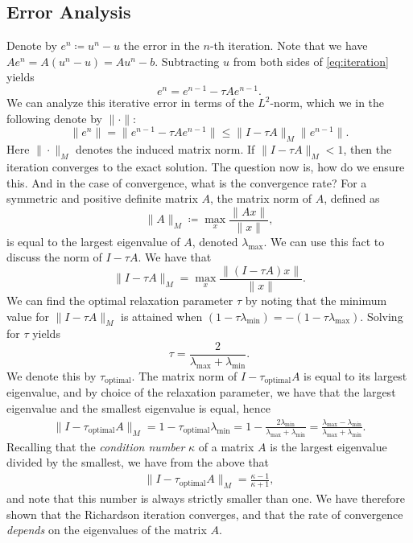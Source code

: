 \subsection{Error Analysis}
\label{sub:error_analysis}

Denote by \( e^n \coloneqq u^n - u \) the error in the \(n\)-th iteration.
Note that we have \( A e^n = A(u^n - u) = Au^n - b \). Subtracting \( u \)
from both sides of \cref{eq:iteration} yields
\begin{equation}
    \label{eq:iteration_error}
    e^n = e^{n-1} - \tau Ae^{n-1}.
\end{equation}
We can analyze this iterative error in terms of the \( L^2 \)-norm, which we in
the following denote by \( \| \cdot \| \):
\begin{equation}
    \| e^n \| = \| e^{n-1} - \tau Ae^{n-1} \| \leq \| I - \tau A\|_M \| e^{n-1}\|.
\end{equation}
Here \( \| \cdot \|_M\) denotes the induced matrix norm. If \( \| I - \tau A
\|_M < 1 \), then the iteration converges to the exact solution. The question
now is, how do we ensure this. And in the case of convergence, what is the
convergence rate?  For a symmetric and positive definite matrix \( A \), the
matrix norm of \( A \), defined as
\begin{equation}
    \| A \|_M \coloneqq \max_x \frac{\|Ax\|}{\|x\|},
\end{equation}
is equal to the largest eigenvalue of \( A \), denoted \( \lambda_{\max} \). We
can use this fact to discuss the norm of \( I - \tau A \). We have that
\begin{equation}
    \| I - \tau A \|_M = \max_x \frac{\|(I - \tau A)x\|}{\| x \|}.
\end{equation}
We can find the optimal relaxation parameter \( \tau \) by noting that the
minimum value for \( \| I - \tau A \|_M \) is attained when \( (1 - \tau
\lambda_{\min}) = - (1 - \tau \lambda_{\max}) \). Solving for \( \tau \) yields 
\begin{equation}
    \tau = \frac{2}{\lambda_{\max} + \lambda_{\min}}.
\end{equation}
We denote this by \( \tau_{\mathrm{optimal}} \).  The matrix norm of \( I -
\tau_{\mathrm{optimal}} A\) is equal to its largest eigenvalue, and by choice
of the relaxation parameter, we have that the largest eigenvalue and the
smallest eigenvalue is equal, hence
\begin{align}
    \| I - \tau_{\mathrm{optimal}} A\|_M   = 1 - \tau_{\mathrm{optimal}}
    \lambda_{\min} = 1 - \frac{2\lambda_{\min}}{\lambda_{\max} +
    \lambda_{\min}} = \frac{\lambda_{\max} - \lambda_{\min}}{\lambda_{\max} +
    \lambda_{\min}}.
\end{align}
Recalling that the \emph{condition number} \( \kappa \) of a matrix \( A \) is
the largest eigenvalue divided by the smallest, we have from the above that
\begin{align}
    \| I - \tau_{\mathrm{optimal}} A\|_M = \frac{\kappa - 1}{\kappa + 1}, 
\end{align}
and note that this number is always strictly smaller than one. We have
therefore shown that the Richardson iteration converges, and that the rate of
convergence \emph{depends} on the eigenvalues of the matrix \( A \).

